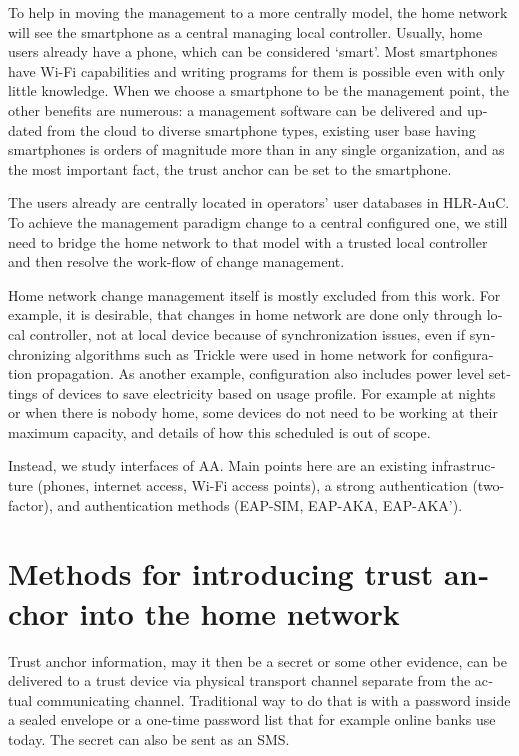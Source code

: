 \documentclass[12pt,a4paper,english]{tutthesis}
\begin{document}
\begin{otherlanguage}{english}
To help in moving the management to a more centrally
model, the home network will see the smartphone as a central managing local
controller.
Usually, home users already have a phone, which can be considered 
`smart'. Most smartphones have Wi-Fi capabilities and writing programs
for them is possible even with only little knowledge.
When we choose a smartphone to be the management point, the other benefits are
numerous:  a management software can be delivered and
updated from the cloud to diverse smartphone types, existing user
base having smartphones is orders of magnitude more than in any single
organization, and as the most important fact, the trust anchor can be set to the smartphone.

The users already are  centrally located  in operators' user databases
in HLR-AuC.  To achieve the management paradigm change to a central configured one,
we still need to bridge the home network to that model with a trusted local controller
and then resolve the work-flow of change management.


Home network change management itself is mostly excluded from this work.
For example, 
it is desirable, that changes in home network are done only through
local controller, not at local device because of
synchronization issues, even 
if synchronizing algorithms such as Trickle \cite{rfc6206} were used in
home network for configuration propagation. As another example,
configuration also includes
power level settings of devices to save electricity based on usage
profile. For example at nights or when there is nobody home, some
devices do not need to be working at their maximum capacity, and
details of how this scheduled is out of scope.

Instead, we study interfaces of AA.  Main points here are an existing
infrastructure (phones, internet access, Wi-Fi access points),  a strong
authentication (two-factor), and authentication methods
(EAP-SIM, EAP-AKA, EAP-AKA').

\section{Methods for introducing trust anchor into the home network}
\label{sec-3-3}
\label{sec:altmethods}

 Trust anchor information, may it then be a secret or some
other evidence, can be delivered to a trust device via physical
transport channel separate from the actual communicating channel.
Traditional way to do that is with a password inside a sealed
envelope or a one-time password list that for example online banks 
use today. The secret can also be sent as an SMS.


\end{otherlanguage}
\end{document}
